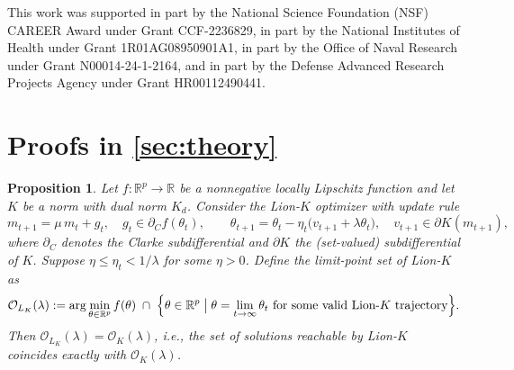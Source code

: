 \documentclass{article}
\newtheorem{proposition}{Proposition}[section]
\begin{document}
\begin{ack}
This work was supported in part by the National Science Foundation (NSF) CAREER Award under Grant CCF-2236829, in part by the National Institutes of Health under Grant 1R01AG08950901A1, in part by the Office of Naval Research under Grant N00014-24-1-2164, and in part by the Defense Advanced Research Projects Agency under Grant HR00112490441.
\end{ack}






\newpage
\appendix

\section{Proofs in \cref{sec:theory}}\label{appendix::theory}
\begin{proposition}\label{prop:exact}
Let $f:\mathbb{R}^p \to \mathbb{R}$ be a nonnegative locally Lipschitz function and let $K$ be a norm with dual norm $K_d$. Consider the Lion-$K$ optimizer with update rule
\[
m_{t+1} = \mu\, m_t + g_t,\quad g_t \in \partial_C f(\theta_t),
\qquad
\theta_{t+1} = \theta_t - \eta_t\bigl(v_{t+1} + \lambda \theta_t\bigr),\quad v_{t+1} \in \partial K(m_{t+1}),
\]
where $\partial_C$ denotes the Clarke subdifferential and $\partial K$ the (set-valued) subdifferential of $K$. Suppose $\eta \le \eta_t < 1/\lambda$ for some $\eta > 0$. Define the limit-point set of Lion-$K$ as
\[
\mathcal{O}_{L_K}(\lambda)
:= \arg\min_{\theta \in \mathbb{R}^p} f(\theta)
\;\cap\;
\Bigl\{ \theta \in \mathbb{R}^p \;\big|\; \theta = \lim_{t\to\infty} \theta_t \text{ for some valid Lion-}K \text{ trajectory} \Bigr\}.
\]
Then $\mathcal{O}_{L_K}(\lambda) = \mathcal{O}_K(\lambda)$, i.e., the set of solutions reachable by Lion-$K$ coincides exactly with $\mathcal{O}_K(\lambda)$.
\end{proposition}
\end{document}
